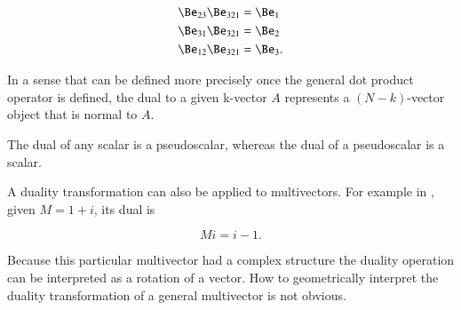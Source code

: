 \begin{dmath}\label{eqn:dual:400}
\begin{aligned}
\Be_{23} \Be_{321} &= \Be_1 \\
\Be_{31} \Be_{321} &= \Be_2 \\
\Be_{12} \Be_{321} &= \Be_3.
\end{aligned}
\end{dmath}

In a sense that can be defined more precisely once the general dot product operator is defined, the dual to a given k-vector \( A \) represents a \((N-k)\)-vector object that is normal to \( A \).

The dual of any scalar is a pseudoscalar, whereas the dual of a pseudoscalar is a scalar.

A duality transformation can also be applied to multivectors.
For example in , given \( M = 1 + i\), its dual is

\begin{dmath}\label{eqn:dual:460}
M i = i - 1.
\end{dmath}

Because this particular multivector had a complex structure the duality operation can be interpreted as a rotation of a vector.
How to geometrically interpret the duality transformation of a general multivector is not obvious.

